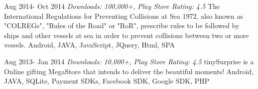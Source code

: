 \begin{projects}
	 	\project
	{}{Aug 2014-  Oct 2014}
	{\textit{Downloads: 100,000+, Play Store Rating: 4.5}}
{The International Regulations for Preventing Collisions at Sea 1972, also known as "COLREGs", "Rules of the Road" or "RoR", prescribe rules to be followed by ships and other vessels at sea in order to prevent collisions between two or more vessels.}
	{ Android, JAVA, JavaScript, JQuery, Html, SPA}
	 \linebreak
     
       	\project
	{}{Aug 2013-  Jan 2014}
		{\textit{Downloads: 10,000+, Play Store Rating: 4.5}}
{tinySurprise is a Online gifting MegaStore that intends to deliver the beautiful moments!}
	{Android, JAVA, SQLite, Payment SDKs, Facebook SDK, Google SDK, PHP}
	 \linebreak
\end{projects}